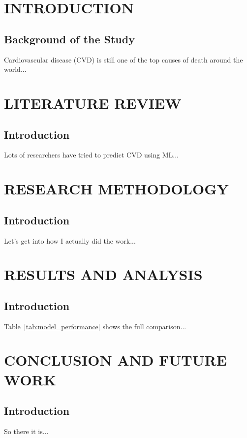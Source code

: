 \documentclass[12pt, a4paper, oneside]{book}
\begin{document}

\chapter{INTRODUCTION}
\section{Background of the Study}
Cardiovascular disease (CVD) is still one of the top causes of death around the world...

\chapter{LITERATURE REVIEW}
\section{Introduction}
Lots of researchers have tried to predict CVD using ML...

\chapter{RESEARCH METHODOLOGY}
\section{Introduction}
Let’s get into how I actually did the work...

\chapter{RESULTS AND ANALYSIS}
\section{Introduction}
Table~\ref{tab:model_performance} shows the full comparison...

\chapter{CONCLUSION AND FUTURE WORK}
\section{Introduction}
So there it is...
\end{document}
